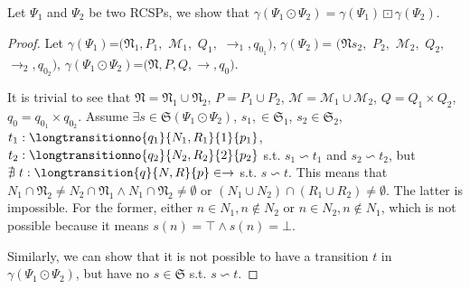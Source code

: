 \begin{theorem}%
Let $\Psi_{1}$ and $\Psi_{2}$ be two RCSPs, we show that $\gamma(\Psi_1 \odot \Psi_2) = \gamma(\Psi_1) \boxdot \gamma(\Psi_2)$.
\end{theorem}
\begin{proof}
Let $\gamma(\Psi_1)$=$(\mathfrak{N}_1,$$P_1,$ $\mathcal{M}_1,$ $Q_1,$ $\rightarrow_1,q_{0_1})$,  $\gamma(\Psi_2)$= $($$\mathfrak{N}s_2,$ $P_2,$ $\mathcal{M}_2,$ $Q_2,$ $\rightarrow_2,q_{0_2})$, $\gamma(\Psi_1 \odot \Psi_2)$=$(\mathfrak{N},$$P,$$Q,$$\rightarrow,q_{0})$.

It is trivial to see that $\mathfrak{N}=\mathfrak{N}_1 \cup \mathfrak{N}_2$, $P=P_1 \cup P_2$, $\mathcal{M}=\mathcal{M}_1 \cup \mathcal{M}_2$, $Q=Q_1 \times Q_2$, $q_0=q_{0_1} \times q_{0_2}$. %
Assume $\exists s \in \mathfrak{S}(\Psi_1 \odot \Psi_2)$, $s_1,\in \mathfrak{S}_1$, $s_2 \in \mathfrak{S}_2$, $t_1:\longtransitionno{q_1}{N_1, R_1}{1}{p_1}$, $t_2:\longtransitionno{q_2}{N_2, R_2}{2}{p_2}$ s.t. $s_1 \backsim t_1$ and $s_2 \backsim t_2$, but $\nexists \  t:\longtransition{q}{N,R}{p} \in \rightarrow$ s.t. $s \backsim t$. %
This means that $N_1 \cap \mathfrak{N}_2 \neq N_2 \cap \mathfrak{N}_1 \wedge N_1 \cap \mathfrak{N}_2 \neq \emptyset$ or $(N_1\cup N_2)\cap(R_1\cup R_2)\neq\emptyset$. The latter is impossible. For the former,  %
either
$n \in N_1, n \notin N_2$ or $n \in N_2, n \notin N_1$, which is not possible because it means $s(n)=\top \wedge s(n)=\bot$.

Similarly, we can show that it is not possible to have a transition $t$ in $\gamma(\Psi_1 \odot \Psi_2)$, but have no $s \in \mathfrak{S}$ s.t. $s \backsim t$.
%
%
%
\end{proof}
